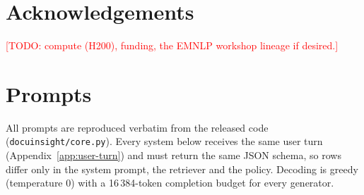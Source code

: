 \documentclass[11pt]{article}
\newcommand{\todo}[1]{\textcolor{red}{[TODO: #1]}}
\begin{document}
\section*{Acknowledgements}
\todo{compute (H200), funding, the EMNLP workshop lineage if desired.}




\appendix
\section{Prompts}
\label{app:prompts}
All prompts are reproduced verbatim from the released code
(\texttt{docuinsight/core.py}). Every system below receives the same user turn
(Appendix~\ref{app:user-turn}) and must return the same JSON schema, so rows
differ only in the system prompt, the retriever and the policy. Decoding is
greedy (temperature 0) with a 16\,384-token completion budget for every
generator.
\end{document}

